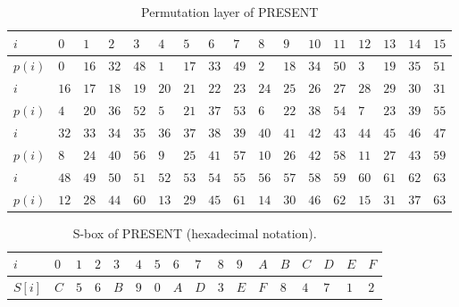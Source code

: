 \begin{table}
\centering
\begin{scriptsize}
\begin{tabular}{|l|l|l|l|l|l|l|l|l|l|l|l|l|l|l|l|l|}
\hline
$i$ & $0$ & $1$ & $2$ & $3$ & $4$ & $5$  & $6$ & $7$ & $8$ & $9$ & $10$ & $11$ & $12$ & $13$  & $14$ & $15$ \\
\hline
$p(i)$ & $0$ & $16$ & $32$ & $48$ & $1$ & $17$ & $33$ & $49$ & $2$ & $18$ & $34$ & $50$ & $3$ & $19$ & $35$ & $51$  \\
\hline
\hline
$i$ & $16$ & $17$ & $18$ & $19$ & $20$ & $21$  & $22$ & $23$ & $24$ & $25$ & $26$ & $27$ & $28$ & $29$  & $30$ & $31$ \\
\hline
$p(i)$ & $4$ & $20$ & $36$ & $52$ & $5$ & $21$ & $37$ & $53$ & $6$ & $22$ & $38$ & $54$ & $7$ & $23$ & $39$ & $55$  \\
\hline
\hline
$i$ & $32$ & $33$ & $34$ & $35$ & $36$ & $37$ & $38$ & $39$ & $40$ & $41$ & $42$ & $43$ & $44$ & $45$ & $46$ & $47$ \\
\hline
$p(i)$ & $8$ & $24$ & $40$ & $56$ & $9$ & $25$ & $41$ & $57$ & $10$ & $26$ & $42$ & $58$ & $11$ & $27$ & $43$ & $59$  \\
\hline
\hline
$i$ & $48$ & $49$ & $50$ & $51$ & $52$ & $53$ & $54$ & $55$ & $56$ & $57$ & $58$ & $59$ & $60$ & $61$ & $62$ & $63$ \\
\hline
$p(i)$ & $12$ & $28$ & $44$ & $60$ & $13$ & $29$ & $45$ & $61$ & $14$ & $30$ & $46$ & $62$ & $15$ & $31$ & $37$ & $63$  \\
\hline
\end{tabular}
\end{scriptsize}
\caption{Permutation layer of PRESENT}
\label{table:permutation_table_PRESENT}
\end{table}

\begin{table}
\centering
\begin{scriptsize}
\begin{tabular}{|l|l|l|l|l|l|l|l|l|l|l|l|l|l|l|l|l|}
\hline
$i$ & $0$ & $1$ & $2$ & $3$ & $4$ & $5$  & $6$ & $7$ & $8$ & $9$ & $A$ & $B$ & $C$ & $D$  & $E$ & $F$ \\
\hline
$S[i]$ & $C$ & $5$ & $6$ & $B$ & $9$ & $0$ & $A$ & $D$ & $3$ & $E$ & $F$ & $8$ & $4$ & $7$ & $1$ & $2$  \\
\hline
\end{tabular}
\end{scriptsize}
\caption{S-box of PRESENT (hexadecimal notation).}
\label{table:substitution_table_PRESENT}
\end{table} 


